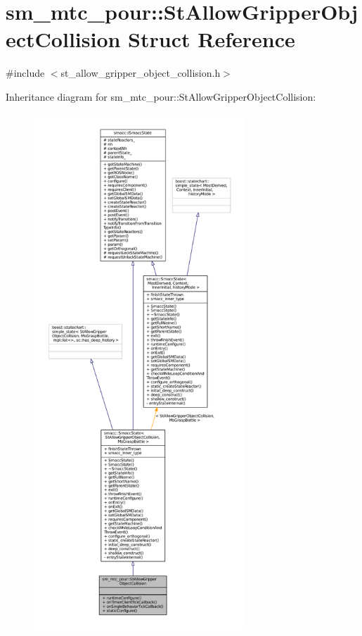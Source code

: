 \hypertarget{structsm__mtc__pour_1_1StAllowGripperObjectCollision}{}\section{sm\+\_\+mtc\+\_\+pour\+:\+:St\+Allow\+Gripper\+Object\+Collision Struct Reference}
\label{structsm__mtc__pour_1_1StAllowGripperObjectCollision}


{\ttfamily \#include $<$st\+\_\+allow\+\_\+gripper\+\_\+object\+\_\+collision.\+h$>$}



Inheritance diagram for sm\+\_\+mtc\+\_\+pour\+:\+:St\+Allow\+Gripper\+Object\+Collision\+:
\nopagebreak
\begin{figure}[H]
\begin{center}
\leavevmode
\includegraphics[height=550pt]{structsm__mtc__pour_1_1StAllowGripperObjectCollision__inherit__graph}
\end{center}
\end{figure}



